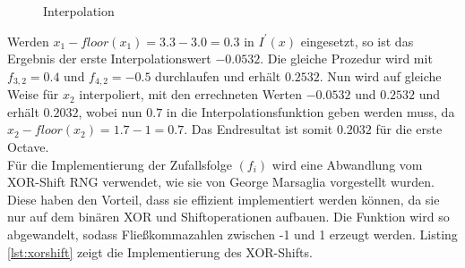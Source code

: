 \documentclass[11pt,a4paper]{article}
\begin{document}
\begin{figure}[!ht]
\centering
{}
\caption[Interpolation]{Interpolation}
\label{fig:iprime}
\end{figure}
Werden $x_1 - floor(x_1) = 3.3 - 3.0 = 0.3$ in $I^\prime(x)$ eingesetzt, so ist das Ergebnis der erste Interpolationswert $-0.0532$. Die gleiche Prozedur wird mit $f_{3, 2} = 0.4$ und $f_{4, 2} = -0.5$ durchlaufen und erhält $0.2532$. Nun wird auf gleiche Weise für $x_2$ interpoliert, mit den errechneten Werten $-0.0532$ und $0.2532$ und erhält $0.2032$, wobei nun $0.7$ in die Interpolationsfunktion geben werden muss, da $x_2 - floor(x_2) = 1.7 - 1 = 0.7$. Das Endresultat ist somit $0.2032$ für die erste Octave.\\
Für die Implementierung der Zufallsfolge $(f_i)$ wird eine Abwandlung vom XOR-Shift RNG verwendet, wie sie von George Marsaglia \cite{ac8e278bab88e59aa3a147bef7b113350a723aa4547b89da74bdcadaf0244f1b} vorgestellt wurden. Diese haben den Vorteil, dass sie effizient implementiert werden können, da sie nur auf dem binären XOR und Shiftoperationen aufbauen. Die Funktion wird so abgewandelt, sodass Fließkommazahlen zwischen -1 und 1 erzeugt werden. Listing \ref{lst:xorshift} zeigt die Implementierung des XOR-Shifts.
\end{document}
